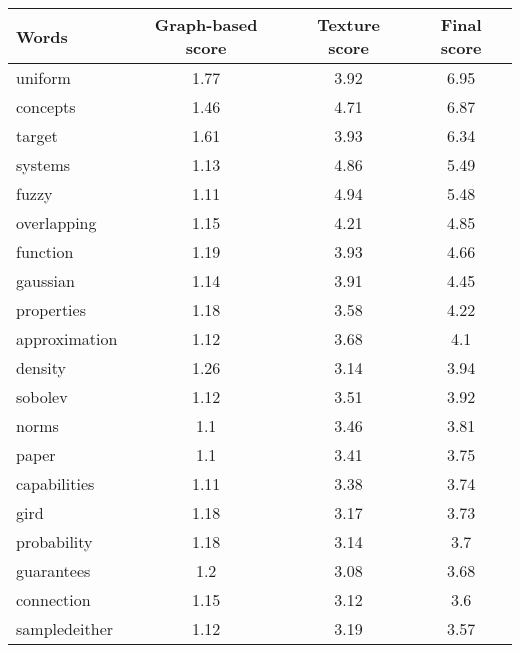 \documentclass[3p]{elsarticle}
\begin{document}
\begin{table}[]
    \begin{center}
        \begin{tabular}{lccc}
            \hline
            \textbf{Words}  &\textbf{Graph-based score} &\textbf{Texture score}  &\textbf{Final score} \\
            \hline
            uniform                & 1.77   & 3.92    & 6.95  \\
            concepts               & 1.46   & 4.71    & 6.87  \\
            target                 & 1.61   & 3.93    & 6.34  \\
            systems                & 1.13   & 4.86    & 5.49  \\
            fuzzy                  & 1.11   & 4.94    & 5.48  \\
            overlapping            & 1.15   & 4.21    & 4.85  \\
            function               & 1.19   & 3.93    & 4.66  \\
            gaussian               & 1.14   & 3.91    & 4.45  \\
            properties             & 1.18   & 3.58    & 4.22  \\
            approximation          & 1.12   & 3.68    & 4.1   \\
            density                & 1.26   & 3.14    & 3.94  \\
            sobolev                & 1.12   & 3.51    & 3.92  \\
            norms                  & 1.1    & 3.46    & 3.81  \\
            paper                  & 1.1    & 3.41    & 3.75  \\
            capabilities           & 1.11   & 3.38    & 3.74  \\
            gird                   & 1.18   & 3.17    & 3.73  \\
            probability            & 1.18   & 3.14    & 3.7   \\
            guarantees             & 1.2    & 3.08    & 3.68  \\
            connection             & 1.15   & 3.12    & 3.6   \\
            sampledeither          & 1.12   & 3.19    & 3.57  \\

\end{tabular}
\end{center}
\end{table}
\end{document}
